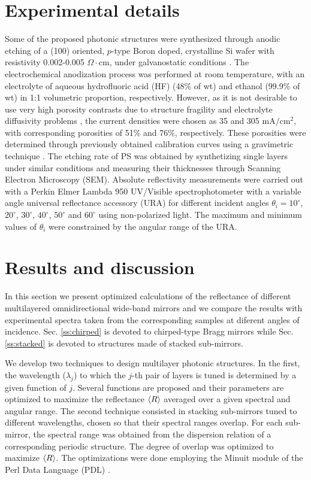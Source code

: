 \documentclass[a4paper,fleqn]{cas-sc}
\begin{document}
\section{Experimental details}\label{s:exp}


Some of the proposed photonic structures were synthesized through anodic
etching of a (100) oriented, $p$-type Boron doped, crystalline Si wafer with
resistivity 0.002-0.005 $\Omega \cdot $cm, under galvanostatic conditions
\cite{Canham1990,Escorcia2007}. The electrochemical anodization process was
performed at room temperature, with an electrolyte of aqueous
hydrofluoric acid (HF) (48$\%$ of
wt) and ethanol (99.9$\%$ of wt) in 1:1 volumetric proportion, respectively.
However, as it is not desirable to use very high
porosity contrasts due to structure fragility and electrolyte
diffusivity problems \cite{Ariza2011}, the current
densities were chosen as 35 and 305 $\text{mA}/\text{cm}^{2}$,
with corresponding porosities of 51\% and 76\%, respectively.
These porosities were determined through previously obtained calibration
curves using a gravimetric technique \cite{Pap2006}. The
etching rate of PS was obtained by synthetizing single layers under
similar conditions and measuring their thicknesses through Scanning
Electron Microscopy (SEM). Absolute reflectivity measurements were
carried out with a Perkin Elmer Lambda 950 UV/Visible
spectrophotometer with a variable angle universal reflectance
accessory (URA) for different incident angles $\theta _{i}=10^{\circ
}$, $20^{\circ }$, $30^{\circ }$, $40^{\circ }$, $50^{\circ }$ and
$60^{\circ }$ using non-polarized light. The maximum and minimum
values of $\theta _{i}$ were constrained by the angular range of the
URA.


\section{Results and discussion}\label{s:res}


In this section we present optimized calculations of the reflectance
of different multilayered omnidirectional wide-band mirrors and we
compare the results with experimental spectra taken from
the corresponding samples at diferent angles of
incidence. Sec. \ref{ss:chirped} is devoted to chirped-type Bragg
mirrors while Sec. \ref{ss:stacked} is devoted to structures made of
stacked sub-mirrors.

We develop two techniques to design
multilayer photonic structures. In the first, the wavelength
($\lambda _{j}$) to which the $j$-th pair of layers is tuned is determined by
a given function of $j$. Several functions are proposed and their
parameters are optimized to maximize the reflectance $\braket{R}$ averaged over
a given spectral and angular range.
The second technique consisted in stacking
sub-mirrors tuned to different wavelengths, chosen so that their
spectral ranges overlap. For each sub-mirror, the spectral range was
obtained from the dispersion relation of a corresponding periodic
structure. The degree of overlap was optimized to maximize $\braket{R}$.
The optimizations were done employing the Minuit module  \cite{minuit}
of the Perl Data Language (PDL) \cite{PDL1997}.
\end{document}
